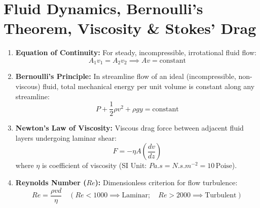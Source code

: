 \documentclass[10pt,a4paper]{article}
\begin{document}
\section{Fluid Dynamics, Bernoulli's Theorem, Viscosity \& Stokes' Drag}

\begin{conceptbox}
\begin{enumerate}[leftmargin=*]
  \item \textbf{Equation of Continuity:} For steady, incompressible, irrotational fluid flow:
  \begin{equation}
    A_1 v_1 = A_2 v_2 \implies A v = \text{constant}
  \end{equation}
  \item \textbf{Bernoulli's Principle:} In streamline flow of an ideal (incompressible, non-viscous) fluid, total mechanical energy per unit volume is constant along any streamline:
  \begin{equation}
    P + \frac{1}{2}\rho v^2 + \rho g y = \text{constant}
  \end{equation}
  \item \textbf{Newton's Law of Viscosity:} Viscous drag force between adjacent fluid layers undergoing laminar shear:
  \begin{equation}
    F = -\eta A \left(\frac{dv}{dz}\right)
  \end{equation}
  where $\eta$ is coefficient of viscosity (SI Unit: $\si{Pa.s} = \si{N.s.m^{-2}} = 10\,\text{Poise}$).
  \item \textbf{Reynolds Number ($Re$):} Dimensionless criterion for flow turbulence:
  \begin{equation}
    Re = \frac{\rho v d}{\eta} \quad (Re < 1000 \implies \text{Laminar}; \quad Re > 2000 \implies \text{Turbulent})
  \end{equation}
\end{enumerate}
\end{conceptbox}
\end{document}
